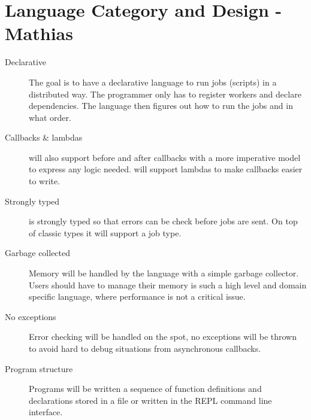 \section{Language Category and Design - Mathias}
\label{sect:desg}
\begin{description}
\item[Declarative] The goal is to have a declarative language to run jobs
(scripts) in a distributed way. The programmer only has to register workers and
declare dependencies. The language then figures out how to run the jobs and in
what order.
\item[Callbacks \& lambdas] \lang will also support before and after callbacks
with a more imperative model to express any logic needed. \lang will support
lambdas to make callbacks easier to write.
\item[Strongly typed] \lang is strongly typed so that errors can be check
before jobs are sent. On top of classic types it will support a job type.
\item[Garbage collected] Memory will be handled by the language with a simple
garbage collector. Users should have to manage their memory is such a high
level and domain specific language, where performance is not a critical issue.
\item[No exceptions] Error checking will be handled on the spot, no exceptions
will be thrown to avoid hard to debug situations from asynchronous callbacks.
\item[Program structure] Programs will be written a sequence of function
definitions and declarations stored in a file or written in the REPL command line
interface.
\end{description}
